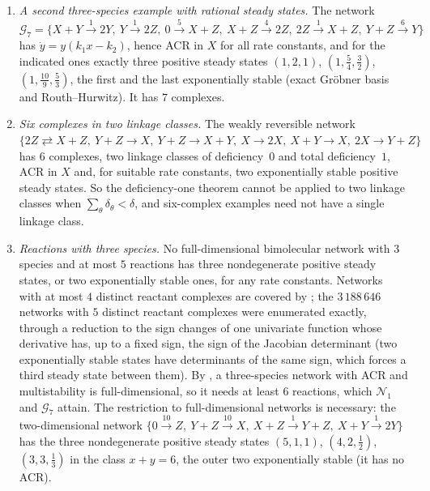\documentclass[11pt,a4paper]{report}
\begin{document}
\begin{enumerate}
\item \emph{A second three-species example with rational steady states.} The network
$\mathcal G_7=\{X+Y\xrightarrow{1}2Y,\ Y\xrightarrow{1}2Z,\ 0\xrightarrow{5}X+Z,\ X+Z\xrightarrow{4}2Z,\
2Z\xrightarrow{1}X+Z,\ Y+Z\xrightarrow{6}Y\}$ has $\dot y=y(k_1x-k_2)$, hence ACR in $X$ for all rate constants,
and for the indicated ones exactly three positive steady states $(1,2,1)$, $(1,\frac54,\frac32)$,
$(1,\frac{10}9,\frac53)$, the first and the last exponentially stable (exact Gröbner basis and Routh--Hurwitz).
It has $7$ complexes.
\item \emph{Six complexes in two linkage classes.} The weakly reversible network
$\{2Z\rightleftarrows X+Z,\ Y+Z\to X,\ Y+Z\to X+Y,\ X\to2X,\ X+Y\to X,\ 2X\to Y+Z\}$ has $6$ complexes, two linkage
classes of deficiency~$0$ and total deficiency~$1$, ACR in $X$ and, for suitable rate constants, two exponentially
stable positive steady states. So the deficiency-one theorem cannot be applied to two linkage classes when
$\sum_\theta\delta_\theta<\delta$, and six-complex examples need not have a single linkage class.
\item \emph{Reactions with three species.} No full-dimensional bimolecular network with $3$ species and at most
$5$ reactions has three nondegenerate positive steady states, or two exponentially stable ones, for any rate
constants. Networks with at most $4$ distinct reactant complexes are covered by
\autocite[Propositions~3.1(3) and~3.5]{KNS2024}; the $3\,188\,646$ networks with $5$ distinct reactant complexes
were enumerated exactly, through a reduction to the sign changes of one univariate function whose derivative has,
up to a fixed sign, the sign of the Jacobian determinant (two exponentially stable states have determinants of the same sign, which
forces a third steady state between them). By \zcref{cor:dimension}, a three-species network with ACR and
multistability is full-dimensional, so it needs at least $6$ reactions, which $\mathcal N_1$ and $\mathcal G_7$
attain. The restriction to full-dimensional networks is necessary: the two-dimensional network
$\{0\xrightarrow{10}Z,\ Y+Z\xrightarrow{10}X,\ X+Z\xrightarrow{1}Y+Z,\ X+Y\xrightarrow{1}2Y\}$ has the three
nondegenerate positive steady states $(5,1,1)$, $(4,2,\frac12)$, $(3,3,\frac13)$ in the class $x+y=6$, the outer two
exponentially stable (it has no ACR).
\end{enumerate}
\end{document}
